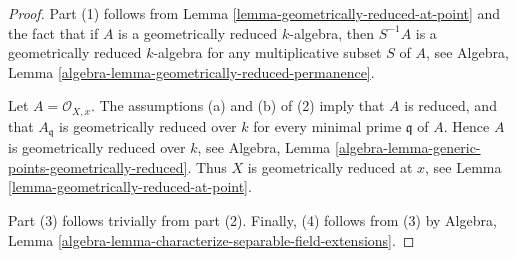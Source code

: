 \documentclass[10pt,a4paper]{amsart}
\theoremstyle{plain}
\theoremstyle{definition}
\theoremstyle{remark}
\numberwithin{equation}{subsection}
\begin{document}
\begin{proof}
Part (1) follows from
Lemma \ref{lemma-geometrically-reduced-at-point}
and the fact that if $A$ is a geometrically reduced
$k$-algebra, then $S^{-1}A$ is a geometrically reduced $k$-algebra for
any multiplicative subset $S$ of $A$, see
Algebra, Lemma \ref{algebra-lemma-geometrically-reduced-permanence}.

\medskip\noindent
Let $A = \mathcal{O}_{X, x}$. The assumptions (a) and (b) of (2) imply
that $A$ is reduced, and that $A_{\mathfrak q}$ is geometrically
reduced over $k$ for every minimal prime $\mathfrak q$ of $A$.
Hence $A$ is geometrically reduced over $k$, see
Algebra, Lemma \ref{algebra-lemma-generic-points-geometrically-reduced}.
Thus $X$ is geometrically reduced at $x$, see
Lemma \ref{lemma-geometrically-reduced-at-point}.

\medskip\noindent
Part (3) follows trivially from part (2). Finally, (4) follows
from (3) by Algebra,
Lemma \ref{algebra-lemma-characterize-separable-field-extensions}.
\end{proof}
\end{document}
